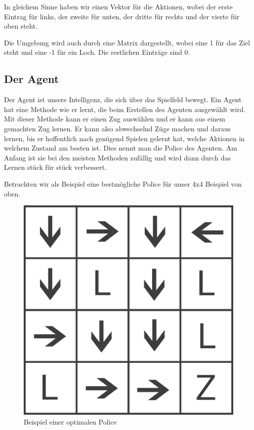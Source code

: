 In gleichem Sinne haben wir einen Vektor für die Aktionen, wobei der erste Eintrag für links, der zweite für unten, der dritte für rechts und der vierte für oben steht.

Die Umgebung wird auch durch eine Matrix dargestellt, wobei eine 1 für das Ziel steht und eine -1 für ein Loch. Die restlichen Einträge sind 0.

\subsection{Der Agent}
\label{subsec:agent}

Der Agent ist unsere Intelligenz, die sich über das Spielfeld bewegt. Ein Agent hat eine Methode wie er lernt, die beim Erstellen des Agenten ausgewählt wird. Mit dieser Methode kann er einen Zug auswählen und er kann aus einem gemachten Zug lernen. Er kann also abwechselnd Züge machen und daraus lernen, bis er hoffentlich nach genügend Spielen gelernt hat, welche Aktionen in welchem Zustand am besten ist. Dies nennt man die Police des Agenten. Am Anfang ist sie bei den meisten Methoden zufällig und wird dann durch das Lernen stück für stück verbessert.

Betrachten wir als Beispiel eine bestmögliche Police für unser 4x4 Beispiel von oben.

\begin{figure}[hbt!]
\centering
\includegraphics[width=\textwidth]{Figures/advanced1police.png}
\caption{Beispiel einer optimalen Police}
\label{police}
\end{figure}

